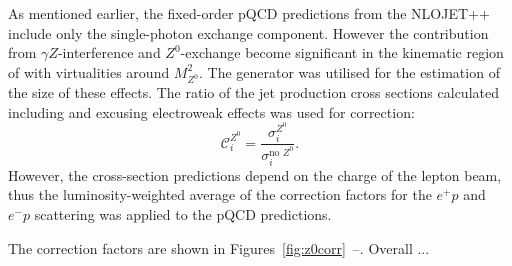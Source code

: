 As mentioned earlier, the fixed-order pQCD predictions from the NLOJET++ include only the single-photon exchange component. However the contribution from $\gamma Z$-interference and $Z^0$-exchange become significant in the kinematic region of with virtualities around $M_{Z^0}^{2}$. The \lepto generator was utilised for the estimation of the size of these effects. The ratio of the jet production cross sections calculated including and excusing electroweak effects was used for correction:
\begin{equation}
 \mathcal{C}^\text{$Z^0$}_i = \frac{\sigma_i^\text{$Z^0$}}{\sigma_i^\text{no $Z^0$}}.
 \label{eq:z0corr}
\end{equation}
However, the cross-section predictions depend on the charge of the lepton beam, thus the luminosity-weighted average of the correction factors for the $e^+p$ and $e^-p$ scattering was applied to the pQCD predictions.

The correction factors are shown in Figures~\ref{fig:z0corr}~--. Overall ...


